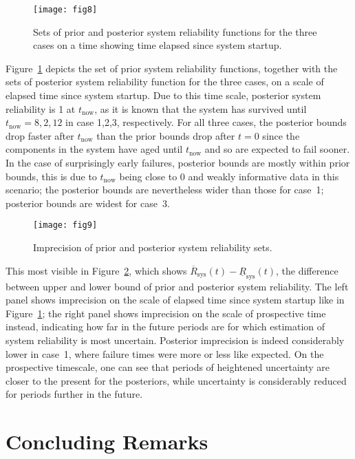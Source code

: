 \documentclass[Journal,letterpaper]{ascelike-new}
\newcommand{\ul}[1]{\underline{#1}}
\newcommand{\ol}[1]{\overline{#1}}
\newcommand{\lRsys}{\ul{R}_\text{sys}}
\newcommand{\uRsys}{\ol{R}_\text{sys}}
\def\tnow{t_\text{now}}
\begin{document}
\begin{figure}
\texttt{[image: fig8]}
\caption{Sets of prior and posterior system reliability functions for the three cases
on a time showing time elapsed since system startup.}
\label{fig:brake-sysrels}
\end{figure}
%
Figure~\ref{fig:brake-sysrels} depicts the set of prior system reliability functions,
together with the sets of posterior system reliability function for the three cases,
on a scale of elapsed time since system startup.
Due to this time scale, posterior system reliability is 1 at $\tnow$,
as it is known that the system has survived until $\tnow = 8, 2, 12$ in case 1,2,3, respectively.
For all three cases, the posterior bounds drop faster after $\tnow$ than the prior bounds drop after $t = 0$
since the components in the system have aged until $\tnow$ and so are expected to fail sooner.
In the case of surprisingly early failures, posterior bounds are mostly within prior bounds,
this is due to $\tnow$ being close to $0$ and weakly informative data in this scenario;
the posterior bounds are nevertheless wider than those for case~1;
posterior bounds are widest for case~3.
%
\begin{figure}
\texttt{[image: fig9]}
\caption{Imprecision of prior and posterior system reliability sets.}
\label{fig:brake-sysrels-imprecision}
\end{figure}
%
This most visible in Figure~\ref{fig:brake-sysrels-imprecision},
which shows $\uRsys(t) - \lRsys(t)$, the difference between upper and lower bound
of prior and posterior system reliability.
The left panel shows imprecision on the scale of elapsed time since system startup like in Figure~\ref{fig:brake-sysrels};
the right panel shows imprecision on the scale of prospective time instead,
indicating how far in the future periods are for which estimation of system reliability is most uncertain.
Posterior imprecision is indeed considerably lower in case~1,
where failure times were more or less like expected.
On the prospective timescale, one can see that periods of heightened uncertainty are closer to the present for the posteriors,
while uncertainty is considerably reduced for periods further in the future.

\newpage
\section{Concluding Remarks}
\label{sec:concluding}
\end{document}
